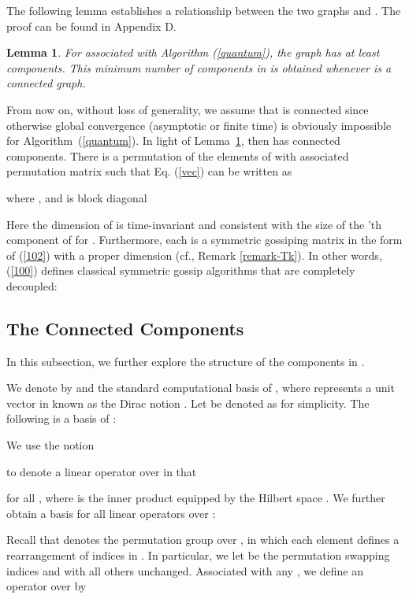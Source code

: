 \documentclass[a4paper, 11pt]{article}
\newtheorem{lemma}{Lemma}
\begin{document}
The following lemma establishes a relationship between the two graphs  and  . The proof can be found in Appendix D.

\medskip

\begin{lemma}\label{lempartition}
For  associated with Algorithm (\ref{quantum}), the graph 
has at least  components. This minimum number of {components in}  is {obtained} whenever   is a connected graph.
\end{lemma}

\medskip

{From now on,  without loss of generality, we} assume that    is connected since otherwise global convergence (asymptotic or finite time) is {obviously} impossible for Algorithm~(\ref{quantum}).  In light of Lemma~\ref{lempartition},  then has  connected components. There is a permutation of {the elements of  with associated permutation matrix}  such that  Eq. (\ref{vec}) can be written as

where ,  and  is {block diagonal}

Here the dimension of  is time-invariant and consistent with the size of the 'th component of  for .  {Furthermore,} each  is  a symmetric gossiping matrix in the form of (\ref{102}) with a proper dimension (cf., Remark \ref{remark-Tk}). In other words, (\ref{100}) defines   classical symmetric  gossip algorithms that are completely decoupled:



\subsection{The Connected Components}
In this subsection, we further explore the structure of the  components in .

We denote by  and  the standard  computational basis of , where  represents a unit vector in  known as the Dirac notion \cite{Nielsen}. Let  be denoted as  for simplicity. The following is a basis of :

We use the notion \cite{Nielsen}

to denote a linear operator over  in that

for all  , where  is the inner product equipped by the Hilbert space . We further obtain a basis for all linear operators over :


Recall that  denotes the permutation group over , in which each element   defines a rearrangement  of indices in . {In particular,  we let  be the permutation swapping indices  and  with all others  unchanged.}   Associated with any , we define an operator  over  by
\end{document}
